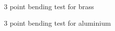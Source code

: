 \documentclass{scrartcl}
\begin{document}
\begin{figure}[!ht]
    \centering
    \begin{subfigure}{0.32\textwidth}
        \caption{3 point bending test for brass}
    \end{subfigure}
    \begin{subfigure}{0.32\textwidth}
        \caption{3 point bending test for aluminium}
    \end{subfigure}
    \begin{subfigure}{0.32\textwidth}

\end{subfigure}
\end{figure}
\end{document}
